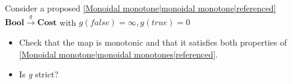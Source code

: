 
Consider a proposed \ref{Monoidal monotone|monoidal monotone|referenced} $\mathbf{Bool}\xrightarrow{g}\mathbf{Cost}$ with $g(false)=\infty, g(true)=0$
    \begin{itemize}
      \item Check that the map is monotonic and that it satisfies both properties of \ref{Monoidal monotone|monoidal monotones|referenced}.
      \item Is \emph{g} strict?\end{itemize}